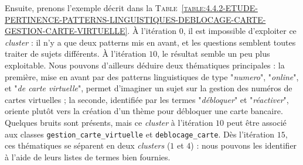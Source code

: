 			Ensuite, prenons l'exemple décrit dans la \textsc{Table~\ref{table:4.4.2-ETUDE-PERTINENCE-PATTERNS-LINGUISTIQUES-DEBLOCAGE-CARTE-GESTION-CARTE-VIRTUELLE}}.
			À l'itération $0$, il est impossible d'exploiter ce \textit{cluster} : il n'y a que deux patterns mis en avant, et les questions semblent toutes traiter de sujets différents.
			À l'itération $10$, le résultat semble un peu plus exploitable.
			Nous pouvons d'ailleurs déduire deux thématiques principales : la première, mise en avant par des patterns linguistiques de type "\textit{numero}", "\textit{online}", et "\textit{de carte virtuelle}", permet d'imaginer un sujet sur la gestion des numéros de cartes virtuelles ; la seconde, identifiée par les termes "\textit{débloquer}" et "\textit{réactiver}", oriente plutôt vers la création d'un thème pour débloquer une carte bancaire.
			Quelques bruits sont présents, mais ce \textit{cluster} à l'itération $10$ peut être associé aux classes \texttt{gestion\_carte\_virtuelle} et \texttt{deblocage\_carte}.
			Dès l'itération $15$, ces thématiques se séparent en deux \textit{clusters} ($1$ et $4$) : nous pouvons les identifier à l'aide de leurs listes de termes bien fournies.
